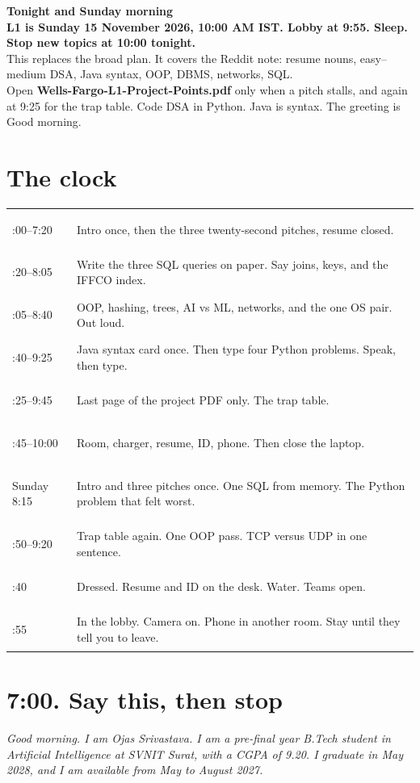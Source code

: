 \documentclass[a4paper,9.5pt]{extarticle}
\begin{document}
\begin{center}
  {\LARGE\textbf{Tonight and Sunday morning}}\\[2pt]
  {\small\color{hot}\textbf{L1 is Sunday 15 November 2026, 10:00 AM IST. Lobby at 9:55. Sleep. Stop new topics at 10:00 tonight.}}\\[2pt]
  {\small This replaces the broad plan. It covers the Reddit note: resume nouns, easy--medium DSA, Java syntax, OOP, DBMS, networks, SQL.}\\[1pt]
  {\footnotesize\color{muted} Open \textbf{Wells-Fargo-L1-Project-Points.pdf} only when a pitch stalls, and again at 9:25 for the trap table. Code DSA in Python. Java is syntax. The greeting is Good morning.}
\end{center}

\section{The clock}
\noindent\begin{tabularx}{\textwidth}{@{}>{\bfseries\raggedright\arraybackslash}p{2.5cm} >{\raggedright\arraybackslash}X@{}}
7:00--7:20 & Intro once, then the three twenty-second pitches, resume closed. \\
7:20--8:05 & Write the three SQL queries on paper. Say joins, keys, and the IFFCO index. \\
8:05--8:40 & OOP, hashing, trees, AI vs ML, networks, and the one OS pair. Out loud. \\
8:40--9:25 & Java syntax card once. Then type four Python problems. Speak, then type. \\
9:25--9:45 & Last page of the project PDF only. The trap table. \\
9:45--10:00 & Room, charger, resume, ID, phone. Then close the laptop. \\
Sunday 8:15 & Intro and three pitches once. One SQL from memory. The Python problem that felt worst. \\
8:50--9:20 & Trap table again. One OOP pass. TCP versus UDP in one sentence. \\
9:40 & Dressed. Resume and ID on the desk. Water. Teams open. \\
9:55 & In the lobby. Camera on. Phone in another room. Stay until they tell you to leave. \\
\end{tabularx}

\section{7:00. Say this, then stop}
\textit{Good morning. I am Ojas Srivastava. I am a pre-final year B.Tech student in Artificial Intelligence at SVNIT Surat, with a CGPA of 9.20. I graduate in May 2028, and I am available from May to August 2027.}
\end{document}
